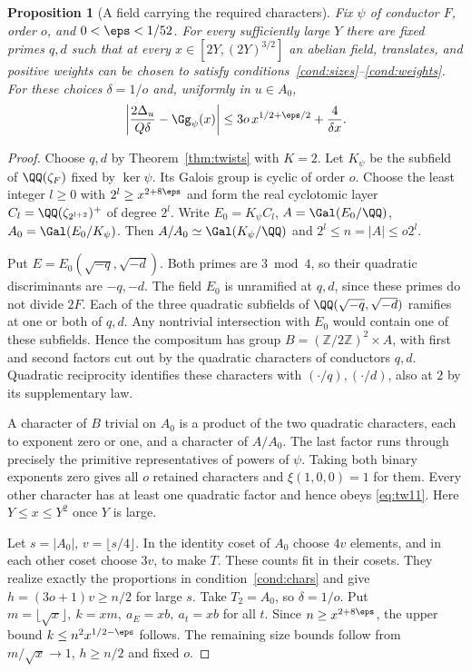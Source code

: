 \documentclass[a4paper,11pt]{article}
\newtheorem{proposition}{Proposition}[section]
\theoremstyle{definition}
\theoremstyle{remark}
\newcommand{\ZZ}{\mathbb Z}\newcommand{\ord}{\operatorname{ord}}
\numberwithin{equation}{section}
\begin{document}
\begin{proposition}[A field carrying the required characters]\label{prop:field12}
Fix \(\psi\) of conductor \(F\), order \(o\), and \(0<\eps<1/52\). For every sufficiently large \(Y\) there are fixed primes \(q,d\) such that at every \(x\in[2Y,(2Y)^{3/2}]\) an abelian field, translates, and positive weights can be chosen to satisfy conditions~\ref{cond:sizes}--\ref{cond:weights}. For these choices \(\delta=1/o\) and, uniformly in \(u\in A_0\),
\begin{equation}
 \left|\frac{2\Delta_u}{Q\delta}-\Gg_\psi(x)\right|
             \le 3o\,x^{1/2+\eps/2}+\frac{4}{\delta x}.              \label{eq:actual12}
\end{equation}
\end{proposition}
\begin{proof}
Choose \(q,d\) by Theorem~\ref{thm:twists} with \(K=2\). Let \(K_\psi\) be the subfield of \(\QQ(\zeta_F)\) fixed by \(\ker\psi\). Its Galois group is cyclic of order \(o\). Choose the least integer \(l\ge0\) with \(2^l\ge x^{2+8\eps}\) and form the real cyclotomic layer \(C_l=\QQ(\zeta_{2^{l+2}})^+\) of degree \(2^l\). Write \(E_0=K_\psi C_l\), \(A=\Gal(E_0/\QQ)\), \(A_0=\Gal(E_0/K_\psi)\). Then \(A/A_0\simeq\Gal(K_\psi/\QQ)\) and \(2^l\le n=|A|\le o2^l\).

Put \(E=E_0(\sqrt{-q},\sqrt{-d})\). Both primes are \(3\bmod4\), so their quadratic discriminants are \(-q,-d\). The field \(E_0\) is unramified at \(q,d\), since these primes do not divide \(2F\). Each of the three quadratic subfields of \(\QQ(\sqrt{-q},\sqrt{-d})\) ramifies at one or both of \(q,d\). Any nontrivial intersection with \(E_0\) would contain one of these subfields. Hence the compositum has group \(B=(\ZZ/2\ZZ)^2\times A\), with first and second factors cut out by the quadratic characters of conductors \(q,d\). Quadratic reciprocity identifies these characters with \((\cdot/q),(\cdot/d)\), also at \(2\) by its supplementary law.

A character of \(B\) trivial on \(A_0\) is a product of the two quadratic characters, each to exponent zero or one, and a character of \(A/A_0\). The last factor runs through precisely the primitive representatives of powers of \(\psi\). Taking both binary exponents zero gives all \(o\) retained characters and \(\xi(1,0,0)=1\) for them. Every other character has at least one quadratic factor and hence obeys \eqref{eq:tw11}. Here \(Y\le x\le Y^2\) once \(Y\) is large.

Let \(s=|A_0|\), \(v=\lfloor s/4\rfloor\). In the identity coset of \(A_0\) choose \(4v\) elements, and in each other coset choose \(3v\), to make \(T\). These counts fit in their cosets. They realize exactly the proportions in condition~\ref{cond:chars} and give \(h=(3o+1)v\ge n/2\) for large \(s\). Take \(T_2=A_0\), so \(\delta=1/o\). Put \(m=\lfloor\sqrt{x}\rfloor,\ k=xm,\ a_E=xb,\ a_t=xb\) for all \(t\). Since \(n\ge x^{2+8\eps}\), the upper bound \(k\le n^2x^{1/2-\eps}\) follows. The remaining size bounds follow from \(m/\sqrt{x}\to1\), \(h\ge n/2\) and fixed \(o\).


\end{proof}
\end{document}
